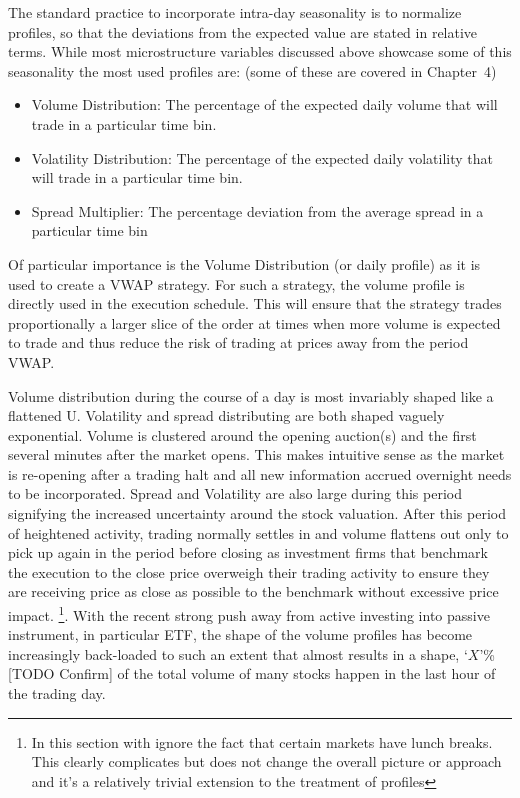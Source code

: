   
The standard practice to incorporate intra-day seasonality is to normalize profiles, so that the deviations from the expected value are stated in relative terms. While most microstructure variables discussed above showcase some of this seasonality the most used profiles are: (some of these are covered in Chapter~4)
	\begin{itemize}
	\item Volume Distribution: The percentage of the expected daily volume that will trade in a particular time bin.
	\item Volatility Distribution: The percentage of the expected daily volatility that will trade in a particular time bin.
	\item Spread Multiplier: The percentage deviation from the average spread in a particular time bin
	\end{itemize}
Of particular importance is the Volume Distribution (or daily profile) as it is used to create a VWAP strategy. For such a strategy, the volume profile is directly used in the execution schedule. This will ensure that the strategy trades proportionally a larger slice of the order at times when more  volume is expected to trade and thus reduce the risk of trading at prices away from the period VWAP.


Volume distribution during the course of a day is most invariably shaped like a flattened U. Volatility and spread distributing are both shaped vaguely exponential. Volume is clustered around the opening auction(s) and the first several minutes after the market opens. This makes intuitive sense as the market is re-opening after a trading halt and all new information accrued overnight needs to be incorporated. Spread and Volatility are also large during this period signifying the increased uncertainty around the stock valuation. After this period of heightened activity,  trading normally settles in and volume flattens out only to pick up again in the period before closing as investment firms that benchmark the execution to the close price overweigh their trading activity to ensure they are receiving price as close as possible to the benchmark without excessive price impact. 
\footnote{In this section with ignore the fact that certain markets have lunch breaks. This clearly complicates but does not change the overall picture or approach and it's a relatively trivial extension to the treatment of profiles}. With the recent strong push away from active investing into passive instrument, in particular ETF, the shape of the volume profiles has become increasingly back-loaded to such an extent that almost results in a shape, `$X$'\%  [TODO Confirm] of the total volume of many stocks happen in the last hour of the trading day.


